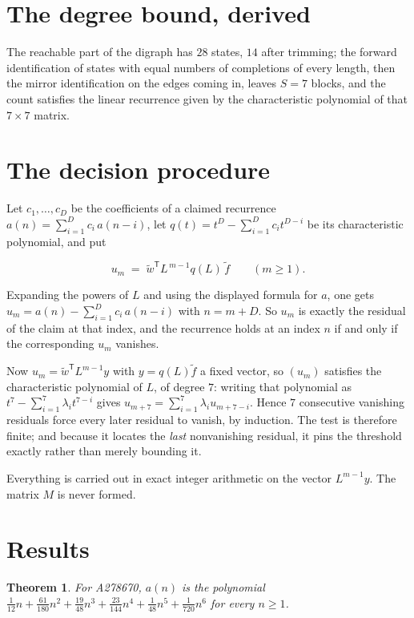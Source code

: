 \documentclass[11pt]{article}
\newtheorem{theorem}{Theorem}
\theoremstyle{definition}
\begin{document}
\section{The degree bound, derived}

The reachable part of the digraph has $28$ states, $14$ after trimming; the forward identification of states with equal numbers of completions of every length, then the mirror identification on the edges coming in, leaves $S = 7$ blocks, and the count satisfies the linear recurrence given by the characteristic polynomial of that $7\times7$ matrix.

\section{The decision procedure}

Let $c_1,\dots,c_D$ be the coefficients of a claimed recurrence $a(n) = \sum_{i=1}^{D} c_i\,a(n-i)$, let $q(t) = t^{D} - \sum_{i=1}^{D} c_i t^{D-i}$ be its characteristic polynomial, and put

\[u_m \;=\; \tilde w^{\mathsf T} L^{\,m-1} q(L)\,\tilde f \qquad (m \ge 1).\]

Expanding the powers of $L$ and using the displayed formula for $a$, one gets $u_m = a(n) - \sum_{i=1}^{D} c_i\,a(n-i)$ with $n = m + D$. So $u_m$ is exactly the residual of the claim at that index, and the recurrence holds at an index $n$ if and only if the corresponding $u_m$ vanishes.

Now $u_m = \tilde w^{\mathsf T} L^{m-1} y$ with $y = q(L)\tilde f$ a fixed vector, so $(u_m)$ satisfies the characteristic polynomial of $L$, of degree $7$: writing that polynomial as $t^{7} - \sum_{i=1}^{7} \lambda_i t^{7-i}$ gives $u_{m+7} = \sum_{i=1}^{7} \lambda_i u_{m+7-i}$. Hence $7$ consecutive vanishing residuals force every later residual to vanish, by induction. The test is therefore finite; and because it locates the {\itshape last} nonvanishing residual, it pins the threshold exactly rather than merely bounding it.

Everything is carried out in exact integer arithmetic on the vector $L^{m-1}y$. The matrix $M$ is never formed.

\section{Results}

\begin{theorem} For A278670, $a(n)$ is the polynomial $\frac{1}{12}n + \frac{61}{180}n^{2} + \frac{19}{48}n^{3} + \frac{23}{144}n^{4} + \frac{1}{48}n^{5} + \frac{1}{720}n^{6}$ for every $n \ge 1$.\end{theorem}
\end{document}
